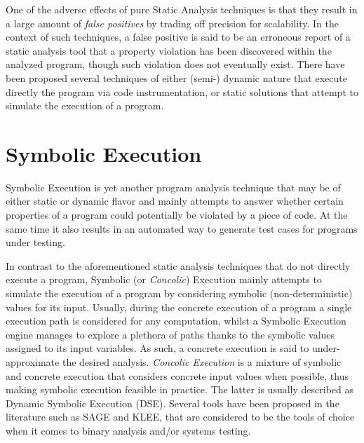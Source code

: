 One of the adverse effects of pure Static Analysis techniques
is that they result in a large amount of \textit{false positives} by
trading off precision for scalability. In the context of
such techniques, a false positive is said to be an erroneous report
of a static analysis tool that a property violation has been
discovered within the analyzed program, though such violation
does not eventually exist. There have been
proposed several techniques of either (semi-) dynamic nature
that execute directly the program via code instrumentation, or
static solutions that attempt to simulate the execution of a program.

\section{Symbolic Execution}

Symbolic Execution is yet another program analysis technique that
may be of either static or dynamic flavor and mainly attempts
to answer whether certain properties of a program could potentially
be violated by a piece of code\cite{baldoni2018survey}. At the same
time it also results in an automated way to generate test cases for
programs under testing.

In contrast to the aforementioned static analysis techniques that
do not directly execute a program, Symbolic (or \textit{Concolic}) Execution
mainly attempts to simulate the execution of a
program by considering symbolic (non-deterministic) values for its input.
Usually, during the concrete execution of a program a single execution path is
considered for any computation, whilst a Symbolic Execution engine manages
to explore a plethora of paths thanks to the symbolic values assigned to
its input variables. As such, a concrete execution is said to under-approximate
the desired analysis. \textit{Concolic Execution} is a mixture of symbolic and concrete
execution that considers concrete input values when possible, thus making
symbolic execution feasible in practice. The latter is usually described
as Dynamic Symbolic Execution (DSE). Several tools have been proposed
in the literature such as SAGE\cite{godefroid2012sage} and KLEE\cite{cadar2008klee},
that are considered to be the tools of choice when it comes to
binary analysis and/or systems testing.

